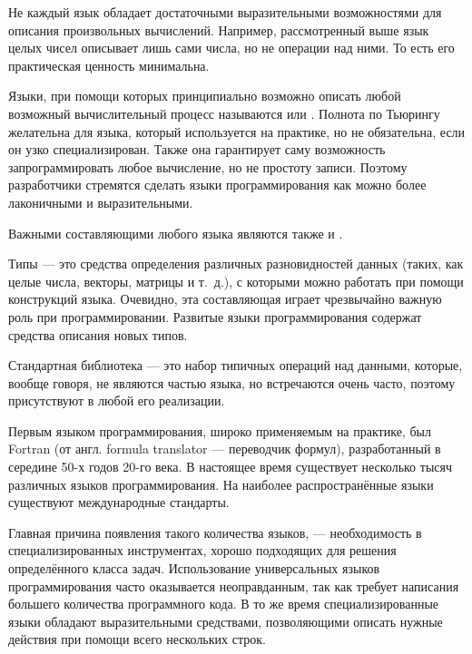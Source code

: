 
Не каждый язык обладает достаточными выразительными возможностями для
описания произвольных вычислений. Например, рассмотренный выше язык
целых чисел описывает лишь сами числа, но не операции над ними. То
есть его практическая ценность минимальна.

Языки, при помощи которых принципиально возможно описать любой
возможный вычислительный процесс называются  или
. Полнота по Тьюрингу
желательна для языка, который используется на практике, но не
обязательна, если он узко специализирован. Также она гарантирует саму
возможность запрограммировать любое вычисление, но не простоту записи.
Поэтому разработчики стремятся сделать языки программирования как
можно более лаконичными и выразительными.


Важными составляющими любого языка являются также
 и
.

Типы — это средства определения различных разновидностей данных
(таких, как целые числа, векторы, матрицы и т.~д.), с которыми можно
работать при помощи конструкций языка. Очевидно, эта составляющая
играет чрезвычайно важную роль при программировании. Развитые языки
программирования содержат средства описания новых типов.

Стандартная библиотека — это набор типичных операций над данными,
которые, вообще говоря, не являются частью языка, но встречаются очень
часто, поэтому присутствуют в любой его реализации.


Первым языком программирования, широко применяемым на практике, был
Fortran (от англ. formula translator — переводчик формул),
разработанный в середине 50-х годов 20-го века. В настоящее время
существует несколько тысяч различных языков программирования. На
наиболее распространённые языки существуют международные
стандарты.

Главная причина появления такого количества языков, — необходимость в
специализированных инструментах, хорошо подходящих для решения
определённого класса задач.  Использование универсальных языков
программирования часто оказывается неоправданным, так как требует
написания большего количества программного кода. В то же время
специализированные языки обладают выразительными средствами,
позволяющими описать нужные действия при помощи всего нескольких
строк.

